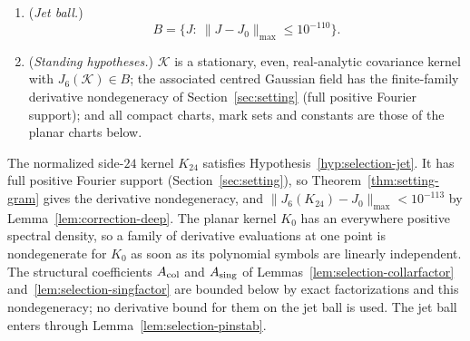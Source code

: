 \begin{hypothesis}\label{hyp:selection-jet}
\begin{enumerate}[(1)]
\item (\emph{Jet ball.})
\begin{equation}\label{eq:selection-jetball}
B=\bigl\{J:\ \|J-J_0\|_{\max}\le10^{-110}\bigr\}.
\end{equation}
\item (\emph{Standing hypotheses.}) $\mathcal K$ is a stationary, even, real-analytic covariance kernel with $J_6(\mathcal K)\in B$; the associated centred Gaussian field has the finite-family derivative nondegeneracy of Section~\ref{sec:setting} (full positive Fourier support); and all compact charts, mark sets and constants are those of the planar charts below.
\end{enumerate}
\end{hypothesis}

\begin{remark}\label{rem:selection-side24}
The normalized side-$24$ kernel $K_{24}$ satisfies Hypothesis~\ref{hyp:selection-jet}. It has full positive Fourier support (Section~\ref{sec:setting}), so Theorem~\ref{thm:setting-gram} gives the derivative nondegeneracy, and $\|J_6(K_{24})-J_0\|_{\max}<10^{-113}$ by Lemma~\ref{lem:correction-deep}. The planar kernel $K_0$ has an everywhere positive spectral density, so a family of derivative evaluations at one point is nondegenerate for $K_0$ as soon as its polynomial symbols are linearly independent. The structural coefficients $A_{\rm col}$ and $A_{\rm sing}$ of Lemmas~\ref{lem:selection-collarfactor} and~\ref{lem:selection-singfactor} are bounded below by exact factorizations and this nondegeneracy; no derivative bound for them on the jet ball is used. The jet ball enters through Lemma~\ref{lem:selection-pinstab}.
\end{remark}

